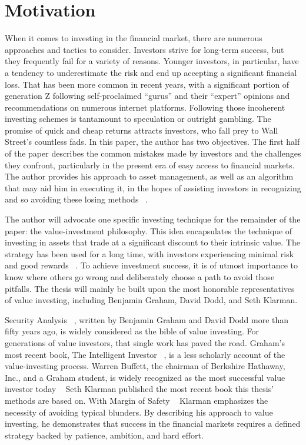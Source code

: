 \documentclass{imc-inf}
\begin{document}
\chapter{Motivation}\label{chap:motivation}
When it comes to investing in the financial market, there are numerous approaches and tactics to consider. Investors strive for long-term success, but they frequently fail for a variety of reasons. Younger investors, in particular, have a tendency to underestimate the risk and end up accepting a significant financial loss. That has been more common in recent years, with a significant portion of generation Z following self-proclaimed “gurus” and their “expert” opinions and recommendations on numerous internet platforms. Following those incoherent investing schemes is tantamount to speculation or outright gambling. The promise of quick and cheap returns attracts investors, who fall prey to Wall Street's countless fads. In this paper, the author has two objectives. The first half of the paper describes the common mistakes made by investors and the challenges they confront, particularly in the present era of easy access to financial markets. The author provides his approach to asset management, as well as an algorithm that may aid him in executing it, in the hopes of assisting investors in recognizing and so avoiding these losing methods ~\cite{margin_of_safety}.

The author will advocate one specific investing technique for the remainder of the paper: the value-investment philosophy. This idea encapsulates the technique of investing in assets that trade at a significant discount to their intrinsic value. The strategy has been used for a long time, with investors experiencing minimal risk and good rewards ~\cite{margin_of_safety}.
To achieve investment success, it is of utmost importance to know where others go wrong and deliberately choose a path to avoid those pitfalls. The thesis will mainly be built upon the most honorable representatives of value investing, including Benjamin Graham, David Dodd, and Seth Klarman. 

Security Analysis ~\cite{security_analysis}, written by Benjamin Graham and David Dodd more than fifty years ago, is widely considered as the bible of value investing. For generations of value investors, that single work has paved the road. Graham's most recent book, The Intelligent Investor ~\cite{the_intelligent_investor}, is a less scholarly account of the value-investing process. Warren Buffett, the chairman of Berkshire Hathaway, Inc., and a Graham student, is widely recognized as the most successful value investor today ~\cite{margin_of_safety} Seth Klarman published the most recent book this thesis’ methods are based on. With Margin of Safety ~\cite{margin_of_safety} Klarman emphasizes the necessity of avoiding typical blunders. By describing his approach to value investing, he demonstrates that success in the financial markets requires a defined strategy backed by patience, ambition, and hard effort.
\end{document}
